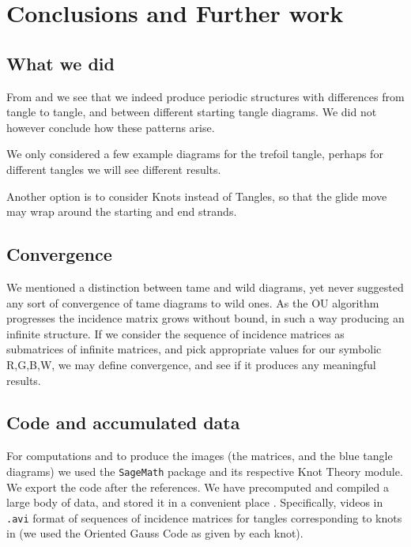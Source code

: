 \section{Conclusions and Further work}

\subsection{What we did}

From  and  we see that we indeed produce periodic structures with differences from tangle to tangle, and between different starting tangle diagrams. We did not however conclude how these patterns arise. 

We only considered a few example diagrams for the trefoil tangle, perhaps for different tangles we will see different results. 

Another option is to consider Knots instead of Tangles, so that the glide move may wrap around the starting and end strands. 

\subsection{Convergence}

We mentioned a distinction between tame and wild diagrams, yet never suggested any sort of convergence of tame diagrams to wild ones. As the OU algorithm progresses the incidence matrix grows without bound, in such a way producing an infinite structure. If we consider the sequence of incidence matrices as submatrices of infinite matrices, and pick appropriate values for our symbolic R,G,B,W, we may define convergence, and see if it produces any meaningful results.

\subsection{Code and accumulated data}

For computations and to produce the images (the matrices, and the blue tangle diagrams) we used the \texttt{SageMath} package and its respective Knot Theory module. We export the code after the references. We have precomputed and compiled a large body of data, and stored it in a convenient place \citep{observations}. Specifically, videos in \texttt{.avi} format of sequences of incidence matrices for tangles corresponding to knots in \citep{rolfsen} (we used the Oriented Gauss Code as given by each knot).